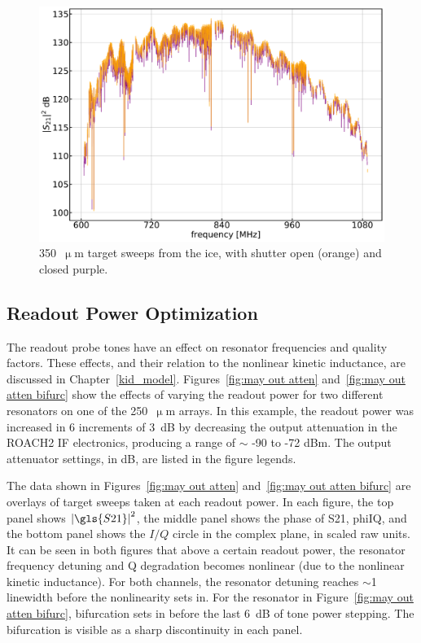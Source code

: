 \begin{figure}[!htbp]
\centering
\includegraphics[width=\textwidth]{figures/blast_data/sweeps/350_targ_ice_overplot}
\caption[~ target sweeps from the ice, with shutter open and closed.]{350~$\upmu$m target sweeps from the ice, with shutter open (orange) and closed {purple}.}
\label{fig:350 targ ice}
\end{figure}

\subsection{Readout Power Optimization}\label{readout power}

The readout probe tones have an effect on resonator frequencies and quality factors. These effects, and their relation to the nonlinear kinetic inductance, are discussed in Chapter~\ref{kid_model}. Figures~\ref{fig:may out atten} and~\ref{fig:may out atten bifurc} show the effects of varying the readout power for two different resonators on one of the 250~$\upmu$m arrays. In this example, the readout power was increased in 6 increments of 3~dB by decreasing the output attenuation in the ROACH2 IF electronics, producing a range of $\sim$ -90 to -72 dBm. The output attenuator settings, in dB, are listed in the figure legends.

The data shown in Figures~\ref{fig:may out atten} and~\ref{fig:may out atten bifurc} are overlays of target sweeps taken at each readout power. In each figure, the top panel shows $\left| \gls{S21} \right|^{2}$, the middle panel shows the phase of \gls{S21}, \gls{phiIQ}, and the bottom panel shows the $I/Q$ circle in the complex plane, in scaled raw units. It can be seen in both figures that above a certain readout power, the resonator frequency detuning and Q degradation becomes nonlinear (due to the nonlinear kinetic inductance). For both channels, the resonator detuning reaches $\sim$1 linewidth before the nonlinearity sets in. For the resonator in Figure~\ref{fig:may out atten bifurc}, bifurcation sets in before the last 6~dB of tone power stepping. The bifurcation is visible as a sharp discontinuity in each panel.

